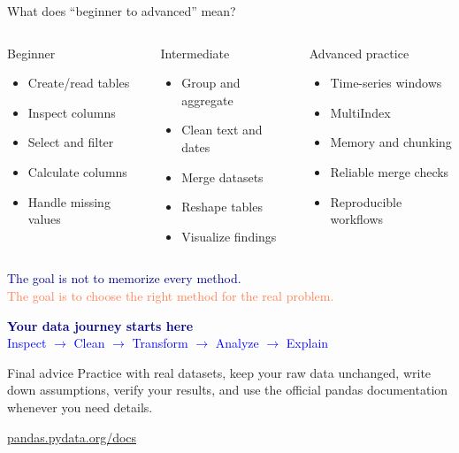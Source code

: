 \documentclass[aspectratio=169,10pt]{beamer}
\begin{document}
\begin{frame}[fragile]{What does “beginner to advanced” mean?}
\begin{columns}[T,onlytextwidth]
\begin{block}{Beginner}
\begin{itemize}
\item Create/read tables
\item Inspect columns
\item Select and filter
\item Calculate columns
\item Handle missing values
\end{itemize}
\end{block}
\begin{block}{Intermediate}
\begin{itemize}
\item Group and aggregate
\item Clean text and dates
\item Merge datasets
\item Reshape tables
\item Visualize findings
\end{itemize}
\end{block}
\begin{block}{Advanced practice}
\begin{itemize}
\item Time-series windows
\item MultiIndex
\item Memory and chunking
\item Reliable merge checks
\item Reproducible workflows
\end{itemize}
\end{block}
\end{columns}
\begin{center}
\Large\textcolor{Navy}{The goal is not to memorize every method.}\\
\large\textcolor{Coral}{The goal is to choose the right method for the real problem.}
\end{center}
\end{frame}

\begin{frame}
\begin{center}
\vspace{1.3cm}
{\Huge\bfseries\textcolor{Navy}{Your data journey starts here}}\\[0.5cm]
{\Large\textcolor{Blue}{Inspect \(\rightarrow\) Clean \(\rightarrow\) Transform \(\rightarrow\) Analyze \(\rightarrow\) Explain}}\\[1cm]
\begin{block}{Final advice}
Practice with real datasets, keep your raw data unchanged, write down assumptions, verify your results, and use the official pandas documentation whenever you need details.
\end{block}
\vspace{0.4cm}
\href{https://pandas.pydata.org/docs/}{pandas.pydata.org/docs}
\end{center}
\end{frame}
\end{document}
